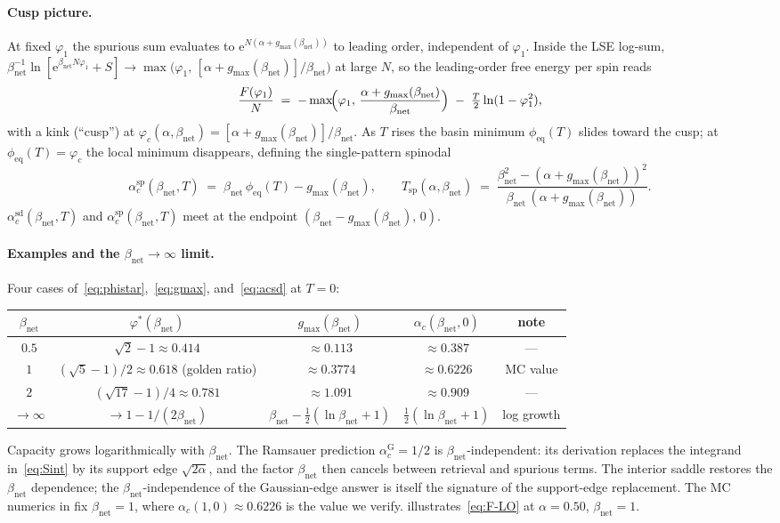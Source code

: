 \documentclass[11pt]{article}
\newcommand{\e}{{\mathrm{e}}}
\newcommand{\Bnet}{\beta_{\mathrm{net}}}
\newcommand{\phieq}{\phi_{\mathrm{eq}}}
\newcommand{\gmax}{g_{\max}}
\newcommand{\acGauss}{\alpha_c^{\mathrm{G}}}
\newcommand{\acSd}{\alpha_c^{\mathrm{sd}}}
\newcommand{\acSp}{\alpha_c^{\mathrm{sp}}}
\begin{document}
\paragraph{Cusp picture.}
At fixed $\varphi_1$ the spurious sum evaluates to
$\e^{N(\alpha + \gmax(\Bnet))}$ to leading order, independent of
$\varphi_1$.  Inside the LSE log-sum,
$\Bnet^{-1} \ln[\e^{\Bnet N \varphi_1} + S] \to
\max\!\bigl(\varphi_1,\,[\alpha + \gmax(\Bnet)]/\Bnet\bigr)$ at large
$N$, so the leading-order free energy per spin reads
\begin{equation}
\frac{F(\varphi_1)}{N} \;=\;
   -\max\!\Bigl(\varphi_1,\,\frac{\alpha + \gmax(\Bnet)}{\Bnet}\Bigr)
   \;-\; \tfrac{T}{2} \ln(1 - \varphi_1^2),
\label{eq:F-LO}
\end{equation}
with a kink (``cusp'') at $\varphi_c(\alpha, \Bnet) = [\alpha +
\gmax(\Bnet)] / \Bnet$.  As $T$ rises the basin minimum $\phieq(T)$
slides toward the cusp; at $\phieq(T) = \varphi_c$ the local minimum
disappears, defining the single-pattern spinodal
\begin{equation}
\acSp(\Bnet, T) \;=\; \Bnet\,\phieq(T) - \gmax(\Bnet),
\qquad
T_{\mathrm{sp}}(\alpha, \Bnet)
   \;=\; \frac{\Bnet^2 - (\alpha + \gmax(\Bnet))^2}
              {\Bnet\,(\alpha + \gmax(\Bnet))}.
\label{eq:acsp}
\end{equation}
$\acSd(\Bnet, T)$ and $\acSp(\Bnet, T)$ meet at the endpoint
$(\Bnet - \gmax(\Bnet),\,0)$.

\paragraph{Examples and the $\Bnet \to \infty$ limit.}
Four cases of~\eqref{eq:phistar},~\eqref{eq:gmax}, and~\eqref{eq:acsd}
at $T = 0$:
\begin{center}
\begin{tabular}{c|cccc}
\hline
$\Bnet$ & $\varphi^{*}(\Bnet)$ & $\gmax(\Bnet)$ & $\alpha_c(\Bnet, 0)$ & note \\
\hline
$0.5$ & $\sqrt 2 - 1 \approx 0.414$ & $\approx 0.113$ & $\approx 0.387$ & — \\
$1$   & $(\sqrt 5 - 1)/2 \approx 0.618$ (golden ratio) & $\approx 0.3774$ & $\approx 0.6226$ & MC value \\
$2$   & $(\sqrt{17} - 1)/4 \approx 0.781$ & $\approx 1.091$ & $\approx 0.909$ & — \\
$\to \infty$ & $\to 1 - 1/(2\Bnet)$ & $\Bnet - \tfrac12(\ln \Bnet + 1)$
              & $\tfrac12 (\ln \Bnet + 1)$ & log growth \\
\hline
\end{tabular}
\end{center}
Capacity grows logarithmically with $\Bnet$.  The Ramsauer prediction
$\acGauss = 1/2$ is $\Bnet$-independent: its derivation replaces the
integrand in~\eqref{eq:Sint} by its support edge $\sqrt{2\alpha}$, and
the factor $\Bnet$ then cancels between retrieval and spurious terms.
The interior saddle restores the $\Bnet$ dependence; the
$\Bnet$-independence of the Gaussian-edge answer is itself the signature
of the support-edge replacement.  The MC numerics in
 fix $\Bnet = 1$, where
$\alpha_c(1,0) \approx 0.6226$ is the value we verify.  
illustrates~\eqref{eq:F-LO} at $\alpha = 0.50$, $\Bnet = 1$.
\end{document}
